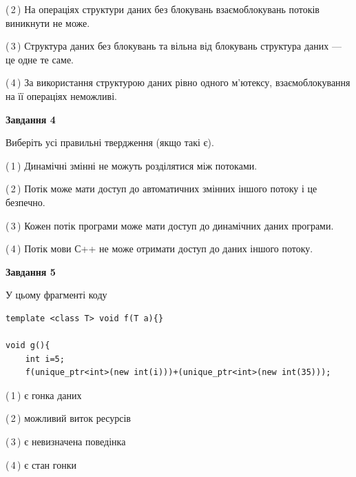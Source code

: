 \documentclass[12pt, ukrainian]{article}
\begin{document}
\begin {large}
{(\,2\,) На операціях структури даних без блокувань взаємоблокувань потоків виникнути не може.%

(\,3\,) Структура даних без блокувань та вільна від блокувань структура даних --- це одне те саме.%

(\,4\,) За використання структурою даних рівно одного м’ютексу, взаємоблокування на її операціях неможливі.%



\begin{center}
\textbf{Завдання 4}
\end{center}
Виберіть усі правильні твердження (якщо такі є).\par
\vspace{2mm}

(\,1\,) Динамічні змінні не можуть розділятися між потоками.%

(\,2\,) Потік може мати доступ до автоматичних змінних іншого потоку і це безпечно.%

(\,3\,) Кожен потік програми може мати доступ до динамічних даних програми.%

(\,4\,) Потік мови С++ не може отримати доступ до даних іншого потоку.%



\begin{center}
\textbf{Завдання 5}
\end{center}
У цьому фрагменті коду
\begin{verbatim}
template <class T> void f(T a){}

void g(){
    int i=5;
    f(unique_ptr<int>(new int(i)))+(unique_ptr<int>(new int(35)));
\end{verbatim}
(\,1\,) є гонка даних%

(\,2\,) можливий виток ресурсів%

(\,3\,) є невизначена поведінка%

(\,4\,) є стан гонки%


}
\end {large}
\end{document}
